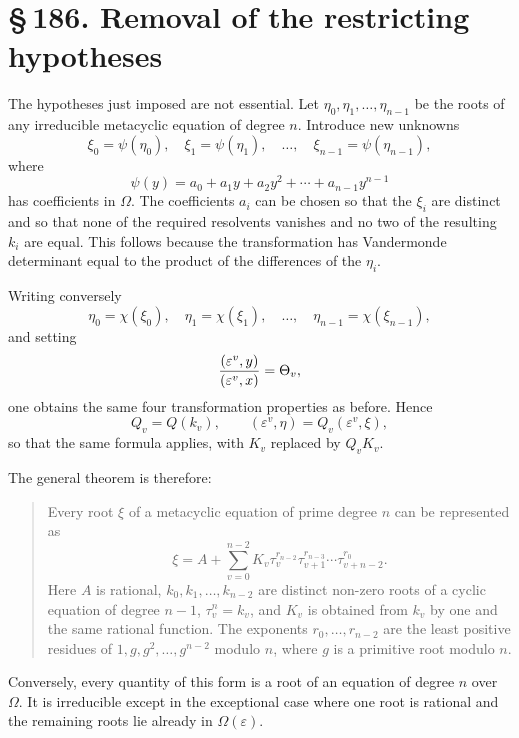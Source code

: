 \documentclass[11pt]{article}
\newcommand{\sect}[2]{\section*{\S\,#1. #2}}
\newcommand{\eps}{\varepsilon}
\newcommand{\Om}{\Omega}
\begin{document}
\sect{186}{Removal of the restricting hypotheses}

The hypotheses just imposed are not essential. Let $\eta_0,\eta_1,\ldots,\eta_{n-1}$ be the roots of any irreducible metacyclic equation of degree $n$. Introduce new unknowns
\begin{equation}
  \xi_0=\psi(\eta_0),\quad \xi_1=\psi(\eta_1),\quad\ldots,\quad
  \xi_{n-1}=\psi(\eta_{n-1}),
\end{equation}
where
\begin{equation}
  \psi(y)=a_0+a_1y+a_2y^2+\cdots+a_{n-1}y^{n-1}
\end{equation}
has coefficients in $\Om$. The coefficients $a_i$ can be chosen so that the $\xi_i$ are distinct and so that none of the required resolvents vanishes and no two of the resulting $k_i$ are equal. This follows because the transformation has Vandermonde determinant equal to the product of the differences of the $\eta_i$.

Writing conversely
\begin{equation}
  \eta_0=\chi(\xi_0),\quad \eta_1=\chi(\xi_1),\quad\ldots,\quad
  \eta_{n-1}=\chi(\xi_{n-1}),
\end{equation}
and setting
\begin{equation}
  { (\eps^v,y)\over (\eps^v,x)}=\Theta_v,
\end{equation}
one obtains the same four transformation properties as before. Hence
\begin{equation}
  Q_v=Q(k_v),\qquad
  (\eps^v,\eta)=Q_v(\eps^v,\xi),
\end{equation}
so that the same formula applies, with $K_v$ replaced by $Q_vK_v$.

The general theorem is therefore:
\begin{quote}
Every root $\xi$ of a metacyclic equation of prime degree $n$ can be represented as
\begin{equation}
  \xi=A+
  \sum_{v=0}^{n-2}K_v\tau_v^{r_{n-2}}\tau_{v+1}^{r_{n-3}}
  \cdots\tau_{v+n-2}^{r_0}.
\end{equation}
Here $A$ is rational, $k_0,k_1,\ldots,k_{n-2}$ are distinct non-zero roots of a cyclic equation of degree $n-1$, $\tau_v^n=k_v$, and $K_v$ is obtained from $k_v$ by one and the same rational function. The exponents $r_0,
\ldots,r_{n-2}$ are the least positive residues of $1,g,g^2,
\ldots,g^{n-2}$ modulo $n$, where $g$ is a primitive root modulo $n$.
\end{quote}
Conversely, every quantity of this form is a root of an equation of degree $n$ over $\Om$. It is irreducible except in the exceptional case where one root is rational and the remaining roots lie already in $\Om(\eps)$.
\end{document}
